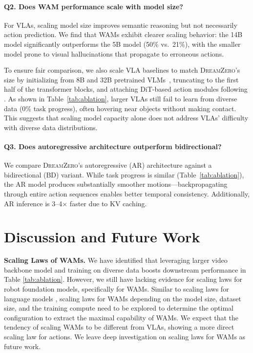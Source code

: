 \documentclass[10pt,logo,copyright]{nvidiatechreport}
\newcommand{\ourmethod}{\mbox{\textsc{DreamZero}}\xspace}
\begin{document}
\paragraph{Q2. Does WAM performance scale with model size?}

For VLAs, scaling model size improves semantic reasoning but not necessarily action prediction. We find that WAMs exhibit clearer scaling behavior: the 14B model significantly outperforms the 5B model (50\% vs.\ 21\%), with the smaller model prone to visual hallucinations that propagate to erroneous actions.

To ensure fair comparison, we also scale VLA baselines to match \ourmethod's size by initializing from 8B and 32B pretrained VLMs~\citep{yang2025qwen3}, truncating to the first half of the transformer blocks, and attaching DiT-based action modules following \citet{bjorck2025gr00t}. As shown in Table~\ref{tab:ablation}, larger VLAs still fail to learn from diverse data (0\% task progress), often hovering near objects without making contact. This suggests that scaling model capacity alone does not address VLAs' difficulty with diverse data distributions.

\paragraph{Q3. Does autoregressive architecture outperform bidirectional?}

We compare \ourmethod's autoregressive (AR) architecture against a bidirectional (BD) variant. While task progress is similar (Table~\ref{tab:ablation}), the AR model produces substantially smoother motions—backpropagating through entire action sequences enables better temporal consistency. Additionally, AR inference is 3--4$\times$ faster due to KV caching. 


\section{Discussion and Future Work}
\textbf{Scaling Laws of WAMs.} We have identified that leveraging larger video backbone model and training on diverse data boosts downstream performance in Table \ref{tab:ablation}. However, we still have lacking evidence for scaling laws for robot foundation models, specifically for WAMs. Similar to scaling laws for language models \citep{kaplan2020scaling}, scaling laws for WAMs depending on the model size, dataset size, and the training compute need to be explored to determine the optimal configuration to extract the maximal capability of WAMs. We expect that the tendency of scaling WAMs to be different from VLAs, showing a more direct scaling law for actions. We leave deep investigation on scaling laws for WAMs as future work. 
\end{document}
